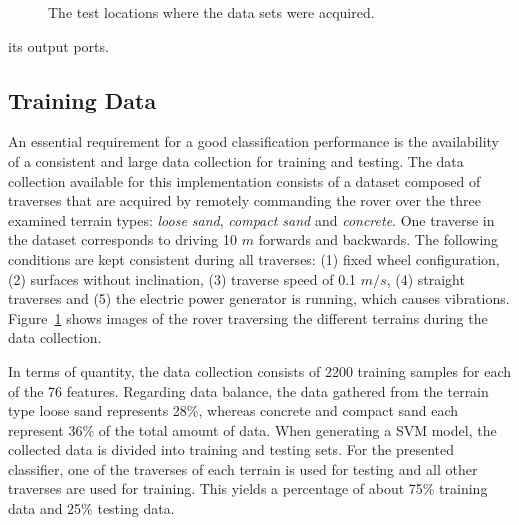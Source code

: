 \begin{figure}[!h]
\begin{minipage}[t]{0.3\linewidth}
	\end{minipage}
	\caption{The test locations where the data sets were acquired.}
	\label{fig:TestLocs}
\end{figure}


its output ports. 


\subsection{Training Data}

An essential requirement for a good classification performance is the availability of a consistent and large data collection for training and testing. 
The data collection available for this implementation consists of a dataset composed of traverses that are acquired by remotely commanding the rover over the three examined terrain types: \emph{loose sand}, \emph{compact sand} and \emph{concrete}. 
One traverse in the dataset corresponds to driving 10 $m$ forwards and backwards. 
The following conditions are kept consistent during all traverses: (1) fixed wheel configuration, (2) surfaces without inclination, (3) traverse speed of 0.1 $m/s$, (4) straight traverses and (5) the electric power generator is running, which causes vibrations.
Figure~\ref{fig:TestLocs} shows images of the rover traversing the different terrains during the data collection.


In terms of quantity, the data collection consists of 2200 training samples for each of the 76 features. 
Regarding data balance, the data gathered from the terrain type loose sand represents 28\%, whereas concrete and compact sand each represent 36\% of the total amount of data.
When generating a SVM model, the collected data is divided into training and testing sets. 
For the presented classifier, one of the traverses of each terrain is used for testing and all other traverses are used for training. 
This yields a percentage of about 75\% training data and 25\% testing data.

